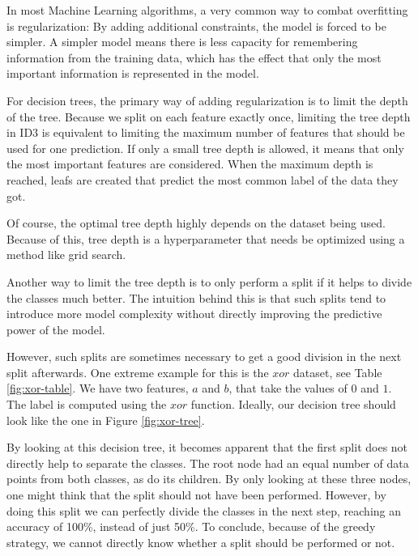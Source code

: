 \documentclass[a4paper]{article}
\begin{document}
In most Machine Learning algorithms, a very common way to combat overfitting is regularization: By adding additional constraints, the model is forced to be simpler. A simpler model means there is less capacity for remembering information from the training data, which has the effect that only the most important information is represented in the model.

For decision trees, the primary way of adding regularization is to limit the depth of the tree. Because we split on each feature exactly once, limiting the tree depth in ID3 is equivalent to limiting the maximum number of features that should be used for one prediction. If only a small tree depth is allowed, it means that only the most important features are considered. When the maximum depth is reached, leafs are created that predict the most common label of the data they got.

Of course, the optimal tree depth highly depends on the dataset being used. Because of this, tree depth is a hyperparameter that needs be optimized using a method like grid search.

Another way to limit the tree depth is to only perform a split if it helps to divide the classes much better. The intuition behind this is that such splits tend to introduce more model complexity without directly improving the predictive power of the model.

However, such splits are sometimes necessary to get a good division in the next split afterwards. One extreme example for this is the $\mathit{xor}$ dataset, see Table \ref{fig:xor-table}. We have two features, $a$ and $b$, that take the values of $0$ and $1$. The label is computed using the $\mathit{xor}$ function. Ideally, our decision tree should look like the one in Figure \ref{fig:xor-tree}.

By looking at this decision tree, it becomes apparent that the first split does not directly help to separate the classes. The root node had an equal number of data points from both classes, as do its children. By only looking at these three nodes, one might think that the split should not have been performed. However, by doing this split we can perfectly divide the classes in the next step, reaching an accuracy of 100\%, instead of just 50\%. To conclude, because of the greedy strategy, we cannot directly know whether a split should be performed or not.

\begin{figure}
\begin{floatrow}
\end{floatrow}
\end{figure}
\end{document}
